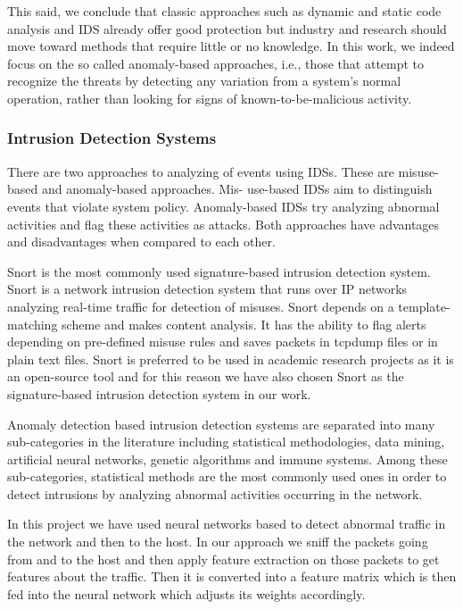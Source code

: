 \documentclass[12pt]{article}
\theoremstyle{definition}
\begin{document}
		This said, we conclude that classic approaches such as dynamic and
		static code analysis and IDS already offer good protection but
		industry and research should move toward methods that require little
		or no knowledge. In this work, we indeed focus on the so called
		anomaly-based approaches, i.e., those that attempt to recognize the
		threats by detecting any variation from a system's normal operation,
		rather than looking for signs of known-to-be-malicious
		activity.
		
			\subsubsection{Intrusion Detection Systems}
			There are two approaches to analyzing of events using IDSs. These are misuse-based and anomaly-based approaches. Mis-
			use-based IDSs aim to distinguish events that violate system policy. Anomaly-based IDSs try analyzing abnormal activities
			and flag these activities as attacks. Both approaches have advantages and disadvantages when compared to each other.
			
			Snort is the most commonly used signature-based intrusion detection system. Snort is a network intrusion detection system that runs over IP networks analyzing real-time traffic for detection of misuses.
			Snort depends on a template-matching scheme and makes content analysis. It has the ability to flag alerts depending on pre-defined misuse rules and saves packets in tcpdump files or in plain text files. Snort is preferred to be used in academic research projects as it is an open-source tool and for this reason we have also chosen Snort as the signature-based intrusion detection system in our work.
			
			Anomaly detection based intrusion detection systems are separated into many sub-categories in the literature including
			statistical methodologies, data mining, artificial neural networks, genetic algorithms and immune systems. Among these sub-categories, statistical methods are the most commonly used ones in order to detect intrusions by analyzing abnormal activities occurring in the network.
			
			In this project we have used neural networks based to detect abnormal traffic in the network and then to the host. In our approach we sniff the packets going from and to the host and then apply feature extraction on those packets to get features about the traffic. Then it is converted into a feature matrix which is then fed into the neural network which adjusts its weights accordingly.
			
\end{document}
